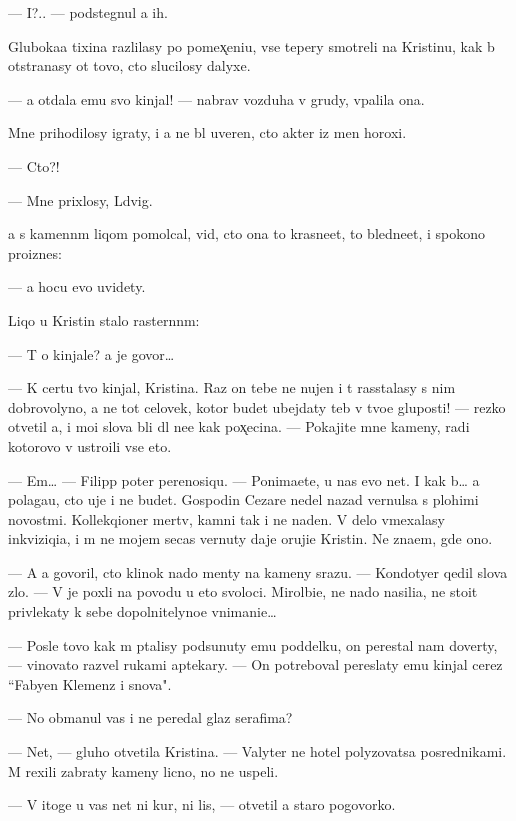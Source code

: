 \documentclass[10pt]{book}
\begin{document}
— I?.. — podstegnul {\y}a ih.

Gluboka{\y}a tixina razlilasy po pomex̨eni{\y}u, vse tepery smotreli na Kristinu, kak b{\yi} otstran{\ia}{\y}asy ot tovo, cto slucilosy dalyxe.

— {\Y}a otdala {\y}emu svo{\y} kinjal! — nabrav vozduha v grudy, v{\yi}palila ona.

Mne prihodilosy igraty, i {\y}a ne b{\yi}l uveren, cto akter iz men{\ia} horoxi{\y}.

— Cto?!

— Mne prixlosy, L{\iu}dvig.

{\Y}a s kamenn{\yi}m liqom pomolcal, vid{\ia}, cto ona to krasne{\y}et, to bledne{\y}et, i spoko{\y}no pro{\y}iznes:

— {\Y}a hocu {\y}evo uvidety.

Liqo u Kristin{\yi} stalo raster{\ia}nn{\yi}m:

— T{\yi} o kinjale? {\Y}a je govor{\iu}…

— K certu tvo{\y} kinjal, Kristina. Raz on tebe ne nujen i t{\yi} rasstalasy s nim dobrovolyno, {\y}a ne tot celovek, kotor{\yi}{\y} budet ubejdaty teb{\ia} v tvo{\y}e{\y} gluposti! — rezko otvetil {\y}a, i mo{\y}i slova b{\yi}li dl{\ia} ne{\y}e kak pox̨ecina. — Pokajite mne kameny, radi kotorovo v{\yi} ustro{\y}ili vse eto.

— Em… — Filipp poter perenosiqu. — Ponima{\y}ete, u nas {\y}evo net. I kak b{\yi}… {\y}a polaga{\y}u, cto uje i ne budet. Gospodin Cezare nedel{\iu} nazad vernulsa s plohimi novost{\ia}mi. Kollekqioner mertv, kamni tak i ne na{\y}den{\yi}. V delo vmexalasy inkviziqi{\y}a, i m{\yi} ne mojem se{\y}cas vernuty daje oruji{\y}e Kristin{\yi}. Ne zna{\y}em, gde ono.

— A {\y}a govoril, cto klinok nado men{\ia}ty na kameny srazu. — Kondotyer qedil slova zlo. — V{\yi} je poxli na povodu u eto{\y} svoloci. Mirol{\iu}bi{\y}e, ne nado nasili{\y}a, ne sto{\y}it privlekaty k sebe dopolnitelyno{\y}e vnimani{\y}e…

— Posle tovo kak m{\yi} p{\yi}talisy podsunuty {\y}emu poddelku, on perestal nam dover{\ia}ty, — vinovato razvel rukami aptekary. — On potreboval pereslaty {\y}emu kinjal cerez ``Fabyen Klemenz i s{\yi}nov{\y}a".

— No obmanul vas i ne peredal glaz serafima?

— Net, — gluho otvetila Kristina. — Valyter ne hotel polyzovatsa posrednikami. M{\yi} rexili zabraty kameny licno, no ne uspeli.

— V itoge u vas net ni kur, ni lis{\yi}, — otvetil {\y}a staro{\y} pogovorko{\y}.
\end{document}
